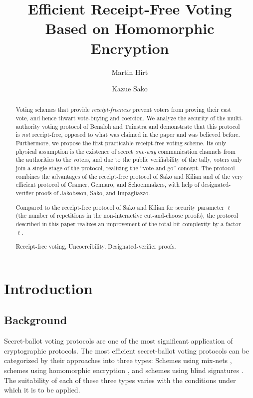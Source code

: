 \documentclass{article}
\title{\bf Efficient Receipt-Free Voting\\
       Based on Homomorphic Encryption}
\author{Martin Hirt \and Kazue Sako}
\begin{document}
\maketitle

\begin{abstract}
  Voting schemes that provide {\em receipt-freeness\/} prevent voters from
  proving their cast vote, and hence thwart vote-buying and
  coercion. 
  We analyze the security of the multi-authority voting
  protocol of Benaloh and Tuinstra and demonstrate that this protocol is
  {\em not\/} receipt-free, opposed to what was claimed in the paper and
  was believed before. Furthermore, we propose the first practicable
  receipt-free voting scheme. Its only physical assumption is the existence
  of secret {\em one-way\/} communication channels from the
  authorities to the voters, and due to the public verifiability of the
  tally, voters only join a single stage of the protocol, realizing the
  ``vote-and-go'' concept. The protocol combines the advantages of the
  receipt-free protocol of Sako and Kilian and of the very efficient
  protocol of Cramer, Gennaro, and Schoenmakers, with help of
  designated-verifier proofs of Jakobsson, Sako, and Impagliazzo.

  Compared to the receipt-free protocol of Sako and Kilian for security
  parameter $\ell$ (the number of repetitions in the non-interactive
  cut-and-choose proofs), the protocol described in this paper realizes an
  improvement of the total bit complexity by a factor $\ell$.

  \smallskip{}
  Receipt-free voting, Uncoercibility, Designated-verifier proofs.
\end{abstract}



\section{Introduction}\label{intro}

\subsection{Background}

Secret-ballot voting protocols are one of the most significant
application of cryptographic protocols. The most efficient
secret-ballot voting protocols can be categorized by their approaches
into three types: Schemes using mix-nets
\cite{Cha81,PIK93,SK95,OKS97,Jak98,Abe99}, schemes using homomorphic
encryption \cite{CF85,CY86,Ben87,%
BT94,SK94,CFSY96,CGS97}, and schemes using
blind signatures \cite{FOO92,Sak94,Oka97}. The suitability of each of
these three types varies with the conditions under which it is to be
applied.
\end{document}
